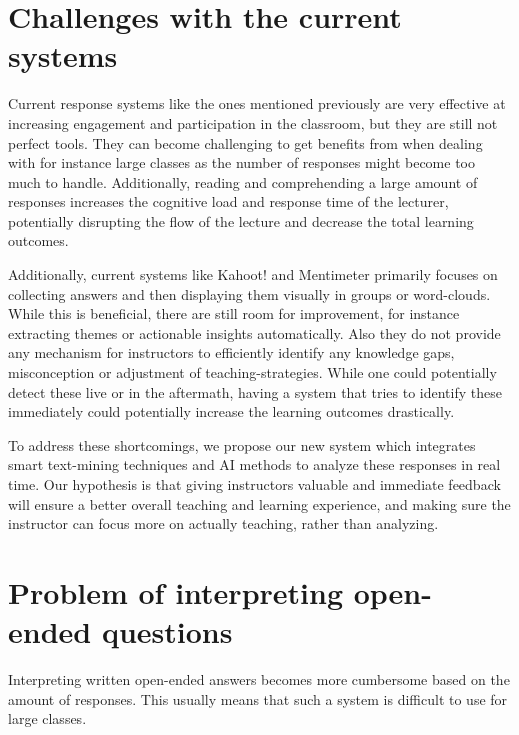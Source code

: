 
\section{Challenges with the current systems}


Current response systems like the ones mentioned previously are very effective at increasing engagement and participation in the classroom, but they are still not perfect tools. They can become challenging to get benefits from when dealing with for instance large classes as the number of responses might become too much to handle. Additionally, reading and comprehending a large amount of responses increases the cognitive load and response time of the lecturer, potentially disrupting the flow of the lecture and decrease the total learning outcomes. 

Additionally, current systems like Kahoot! and Mentimeter primarily focuses on collecting answers and then displaying them visually in groups or word-clouds. While this is beneficial, there are still room for improvement, for instance extracting themes or actionable insights automatically. Also they do not provide any mechanism for instructors to efficiently identify any knowledge gaps, misconception or adjustment of teaching-strategies. While one could potentially detect these live or in the aftermath, having a system that tries to identify these immediately could potentially increase the learning outcomes drastically. 

To address these shortcomings, we propose our new system which integrates smart text-mining techniques and AI methods to analyze these responses in real time. Our hypothesis is that giving instructors valuable and immediate feedback will ensure a better overall teaching and learning experience, and making sure the instructor can focus more on actually teaching, rather than analyzing.



\section{Problem of interpreting open-ended questions}
Interpreting written open-ended answers becomes more cumbersome based on the amount of responses. This usually means that such a system is difficult to use for large classes. 

